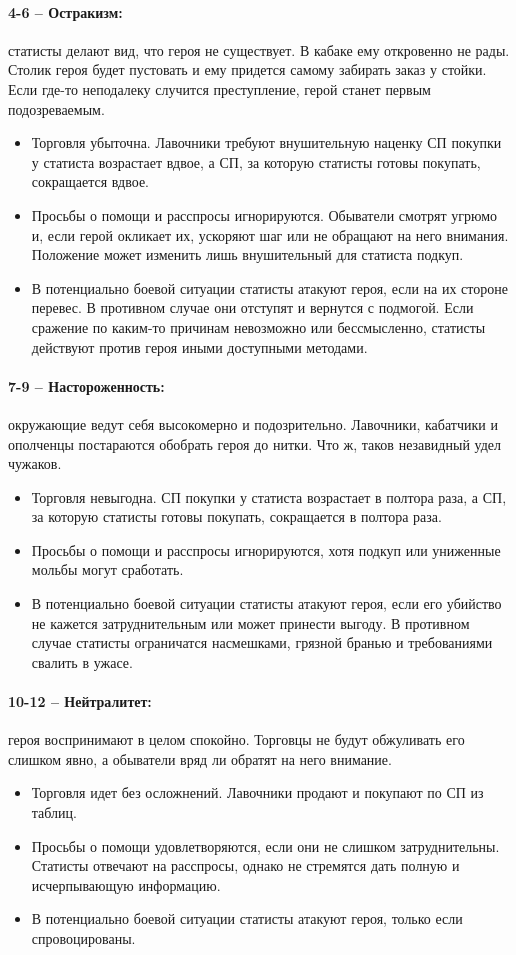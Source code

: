 \paragraph{4-6 – Остракизм:} статисты делают вид, что героя не существует. В кабаке ему откровенно не рады. Столик героя будет пустовать и ему придется самому забирать заказ у стойки. Если где-то неподалеку случится преступление, герой станет первым подозреваемым.
\begin{itemize}
  \item Торговля убыточна. Лавочники требуют внушительную наценку СП покупки у статиста возрастает вдвое, а СП, за которую статисты готовы покупать, сокращается вдвое.
  \item Просьбы о помощи и расспросы игнорируются. Обыватели смотрят угрюмо и, если герой окликает их, ускоряют шаг или не обращают на него внимания. Положение может изменить лишь внушительный для статиста подкуп. 
  \item В потенциально боевой ситуации статисты атакуют героя, если на их стороне перевес. В противном случае они отступят и вернутся с подмогой. Если сражение по каким-то причинам невозможно или бессмысленно, статисты действуют против героя иными доступными методами.
\end{itemize}
\paragraph{7-9 – Настороженность:} окружающие ведут себя высокомерно и подозрительно. Лавочники, кабатчики и ополченцы постараются обобрать героя до нитки. Что ж, таков незавидный удел чужаков.
\begin{itemize}
  \item Торговля невыгодна. СП покупки у статиста возрастает в полтора раза, а СП, за которую статисты готовы покупать, сокращается в полтора раза.
  \item Просьбы о помощи и расспросы игнорируются, хотя подкуп или униженные мольбы могут сработать.
  \item В потенциально боевой ситуации статисты атакуют героя, если его убийство не кажется затруднительным или может принести выгоду. В противном случае статисты ограничатся насмешками, грязной бранью и требованиями свалить в ужасе.
\end{itemize}
\paragraph{10-12 – Нейтралитет:} героя воспринимают в целом спокойно. Торговцы не будут обжуливать его слишком явно, а обыватели вряд ли обратят на него внимание.
\begin{itemize}
  \item Торговля идет без осложнений. Лавочники продают и покупают по СП из таблиц.
  \item Просьбы о помощи удовлетворяются, если они не слишком затруднительны. Статисты отвечают на расспросы, однако не стремятся дать полную и исчерпывающую информацию.
  \item В потенциально боевой ситуации статисты атакуют героя, только если спровоцированы.
\end{itemize}

